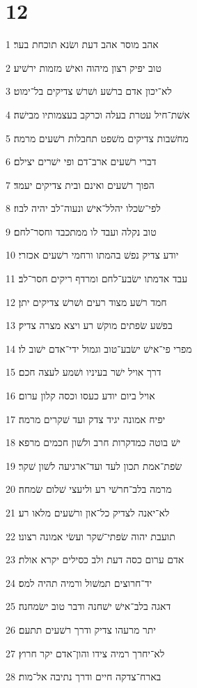 \chapter{12}

\par 1 אהב מוסר אהב דעת ושׂנא תוכחת בער׃
\par 2 טוב יפיק רצון מיהוה ואישׁ מזמות ירשׁיע׃
\par 3 לא־יכון אדם ברשׁע ושׁרשׁ צדיקים בל־ימוט׃
\par 4 אשׁת־חיל עטרת בעלה וכרקב בעצמותיו מבישׁה׃
\par 5 מחשׁבות צדיקים משׁפט תחבלות רשׁעים מרמה׃
\par 6 דברי רשׁעים ארב־דם ופי ישׁרים יצילם׃
\par 7 הפוך רשׁעים ואינם ובית צדיקים יעמד׃
\par 8 לפי־שׂכלו יהלל־אישׁ ונעוה־לב יהיה לבוז׃
\par 9 טוב נקלה ועבד לו ממתכבד וחסר־לחם׃
\par 10 יודע צדיק נפשׁ בהמתו ורחמי רשׁעים אכזרי׃
\par 11 עבד אדמתו ישׂבע־לחם ומרדף ריקים חסר־לב׃
\par 12 חמד רשׁע מצוד רעים ושׁרשׁ צדיקים יתן׃
\par 13 בפשׁע שׂפתים מוקשׁ רע ויצא מצרה צדיק׃
\par 14 מפרי פי־אישׁ ישׂבע־טוב וגמול ידי־אדם ישׁוב לו׃
\par 15 דרך אויל ישׁר בעיניו ושׁמע לעצה חכם׃
\par 16 אויל ביום יודע כעסו וכסה קלון ערום׃
\par 17 יפיח אמונה יגיד צדק ועד שׁקרים מרמה׃
\par 18 ישׁ בוטה כמדקרות חרב ולשׁון חכמים מרפא׃
\par 19 שׂפת־אמת תכון לעד ועד־ארגיעה לשׁון שׁקר׃
\par 20 מרמה בלב־חרשׁי רע וליעצי שׁלום שׂמחה׃
\par 21 לא־יאנה לצדיק כל־און ורשׁעים מלאו רע׃
\par 22 תועבת יהוה שׂפתי־שׁקר ועשׂי אמונה רצונו׃
\par 23 אדם ערום כסה דעת ולב כסילים יקרא אולת׃
\par 24 יד־חרוצים תמשׁול ורמיה תהיה למס׃
\par 25 דאגה בלב־אישׁ ישׁחנה ודבר טוב ישׂמחנה׃
\par 26 יתר מרעהו צדיק ודרך רשׁעים תתעם׃
\par 27 לא־יחרך רמיה צידו והון־אדם יקר חרוץ׃
\par 28 בארח־צדקה חיים ודרך נתיבה אל־מות׃

